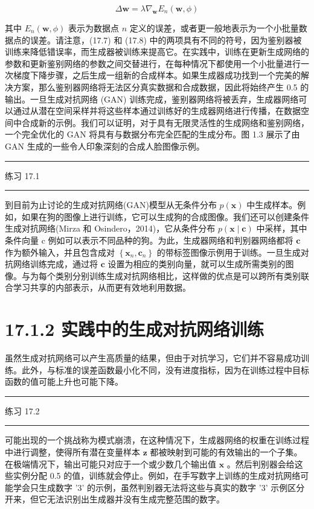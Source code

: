 \documentclass[10pt]{report}
\newcommand{\HRule}{\begin{center}\rule{0.9\linewidth}{0.2mm}\end{center}}
\begin{document}
\[
\Delta \mathbf{w} = \lambda {\nabla }_{\mathbf{w}}{E}_{n}\left( {\mathbf{w},\phi }\right)  \tag{17.8}
\]

其中 \({E}_{n}\left( {\mathbf{w},\phi }\right)\) 表示为数据点 \(n\) 定义的误差，或者更一般地表示为一个小批量数据点的误差。请注意，(17.7) 和 (17.8) 中的两项具有不同的符号，因为鉴别器被训练来降低错误率，而生成器被训练来提高它。在实践中，训练在更新生成网络的参数和更新鉴别网络的参数之间交替进行，在每种情况下都使用一个小批量进行一次梯度下降步骤，之后生成一组新的合成样本。如果生成器成功找到一个完美的解决方案，那么鉴别器网络将无法区分真实数据和合成数据，因此将始终产生 0.5 的输出。一旦生成对抗网络 (GAN) 训练完成，鉴别器网络将被丢弃，生成器网络可以通过从潜在空间采样并将这些样本通过训练好的生成器网络进行传播，在数据空间中合成新的示例。我们可以证明，对于具有无限灵活性的生成网络和鉴别网络，一个完全优化的 GAN 将具有与数据分布完全匹配的生成分布。图 1.3 展示了由 GAN 生成的一些令人印象深刻的合成人脸图像示例。

\HRule

练习 17.1

\HRule

到目前为止讨论的生成对抗网络(GAN)模型从无条件分布 \(p\left( \mathbf{x}\right)\) 中生成样本。例如，如果在狗的图像上进行训练，它可以生成狗的合成图像。我们还可以创建条件生成对抗网络(Mirza 和 Osindero，2014)，它从条件分布 \(p\left( {\mathbf{x} \mid  \mathbf{c}}\right)\) 中采样，其中条件向量 c 例如可以表示不同品种的狗。为此，生成器网络和判别器网络都将 \(\mathbf{c}\) 作为额外输入，并且包含成对 \(\left\{  {{\mathbf{x}}_{n},{\mathbf{c}}_{n}}\right\}\) 的带标签图像示例用于训练。一旦生成对抗网络训练完成，通过将 \(\mathbf{c}\) 设置为相应的类别向量，就可以生成所需类别的图像。与为每个类别分别训练生成对抗网络相比，这样做的优点是可以跨所有类别联合学习共享的内部表示，从而更有效地利用数据。

\section*{17.1.2 实践中的生成对抗网络训练}

虽然生成对抗网络可以产生高质量的结果，但由于对抗学习，它们并不容易成功训练。此外，与标准的误差函数最小化不同，没有进度指标，因为在训练过程中目标函数的值可能上升也可能下降。

\HRule

练习 17.2

\HRule

可能出现的一个挑战称为模式崩溃，在这种情况下，生成器网络的权重在训练过程中进行调整，使得所有潜在变量样本 \(\mathbf{z}\) 都被映射到可能的有效输出的一个子集。在极端情况下，输出可能只对应于一个或少数几个输出值 \(\mathbf{x}\) 。然后判别器会给这些实例分配 0.5 的值，训练就会停止。例如，在手写数字上训练的生成对抗网络可能学会只生成数字 '3' 的示例，虽然判别器无法将这些与真实的数字 '3' 示例区分开来，但它无法识别出生成器并没有生成完整范围的数字。
\end{document}
